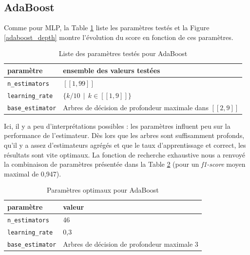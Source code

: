 \documentclass[a4paper]{report}
\begin{document}

\subsection{AdaBoost}

Comme pour MLP, la Table \ref{params_ada} liste les paramètres testés et la Figure \ref{adaboost_depth} montre l'évolution du score en fonction de ces paramètres.

\begin{table}[h]
\centering
\begin{tabular}{ll}
paramètre & ensemble des valeurs testées \\
\hline
\texttt{n\_estimators} & $[\![1, 99]\!]$ \\
\texttt{learning\_rate} & $\{k/10 \>\> | \>\> k \in [\![1, 9]\!] \}$ \\
\texttt{base\_estimator} & Arbres de décision de profondeur maximale dans $[\![2, 9]\!]$\\
\end{tabular}
\caption{Liste des paramètres testés pour AdaBoost\label{params_ada}}
\end{table}

Ici, il y a peu d'interprétations possibles : les paramètres influent peu sur la performance de l'estimateur. Dès lors que les arbres sont suffisamment profonds, qu'il y a assez d'estimateurs agrégés et que le taux d'apprentissage et correct, les résultats sont vite optimaux. La fonction de recherche exhaustive nous a renvoyé la combinaison de paramètres présentée dans la Table \ref{best_params_ada} (pour un \emph{f1-score} moyen maximal de 0,947).

\begin{table}[h]
\centering
\begin{tabular}{ll}
paramètre & valeur \\
\hline
\texttt{n\_estimators} & 46 \\
\texttt{learning\_rate} & 0,3 \\
\texttt{base\_estimator} & Arbres de décision de profondeur maximale 3\\
\end{tabular}
\caption{Paramètres optimaux pour AdaBoost\label{best_params_ada}}
\end{table}
\end{document}
